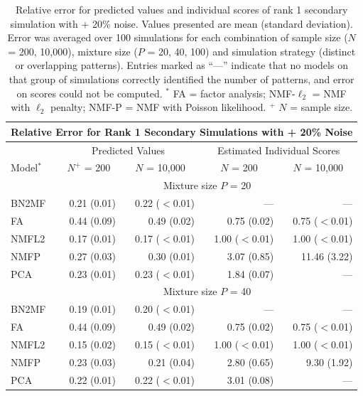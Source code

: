 {\clearpage
\begingroup
\renewcommand{\arraystretch}{1.35}
\begin{table}[!htbp] \centering 
  \caption[Relative error for rank 1 secondary simulations]{Relative error for predicted values and individual scores of rank 1 secondary simulation with + 20\% noise. Values presented are mean (standard deviation). Error was averaged over 100 simulations for each combination of sample size ($N$ = 200, 10,000), mixture size ($P$ = 20, 40, 100) and simulation strategy (distinct or overlapping patterns). Entries marked as ``---'' indicate that no models on that group of simulations correctly identified the number of patterns, and error on scores could not be computed. $^*$ FA = factor analysis; NMF-$\ell_2$ = NMF with $\ell_2$ penalty; NMF-P = NMF with Poisson likelihood. $^+$ $N$ = sample size.}
  \label{table:sup1} 
 \addtolength{\tabcolsep}{-2pt}
\begin{tabular}{lrr|rr}
\multicolumn{5}{c}{Relative Error for Rank 1 Secondary Simulations with + 20\% Noise} \\
\hline 
\hline  
& \multicolumn{2}{c}{Predicted Values} & \multicolumn{2}{c}{Estimated Individual Scores} \\
\hline
\hline  
Model$^*$ & \multicolumn{1}{c}{$N^+$ = 200} & \multicolumn{1}{c}{$N$ = 10,000} & \multicolumn{1}{c}{$N$ = 200} & \multicolumn{1}{c}{$N$ = 10,000} \\
\hline
\hline  
& \multicolumn{4}{c}{Mixture size $P$ = 20} \\
\hline
BN2MF & 0.21 (0.01) & 0.22 ($<$0.01) & --- & --- \\ 
FA & 0.44 (0.09) & 0.49 (0.02) & 0.75 (0.02) & 0.75 ($<$0.01) \\ 
NMFL2 & 0.17 (0.01) & 0.17 ($<$0.01) & 1.00 ($<$0.01) & 1.00 ($<$0.01) \\ 
NMFP & 0.27 (0.03) & 0.30 (0.01) & 3.07 (0.85) & 11.46 (3.22) \\ 
PCA & 0.23 (0.01) & 0.23 ($<$0.01) & 1.84 (0.07) & --- \\ 
\hline 
& \multicolumn{4}{c}{Mixture size $P$ = 40} \\
\hline 
BN2MF & 0.19 (0.01) & 0.20 ($<$0.01) & --- & --- \\ 
FA & 0.44 (0.09) & 0.49 (0.02) & 0.75 (0.02) & 0.75 ($<$0.01) \\ 
NMFL2 & 0.15 (0.02) & 0.15 ($<$0.01) & 1.00 ($<$0.01) & 1.00 ($<$0.01) \\ 
NMFP & 0.23 (0.03) & 0.21 (0.04) & 2.80 (0.65) & 9.30 (1.92) \\ 
PCA & 0.22 (0.01) & 0.22 ($<$0.01) & 3.01 (0.08) & --- \\ 

\end{tabular}
\end{table}}
